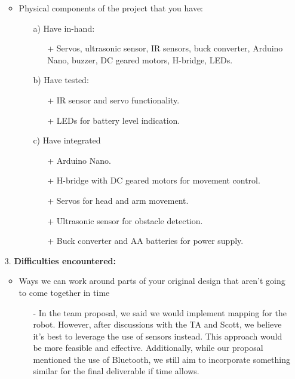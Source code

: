 \documentclass[12pt]{article}
\begin{document}
\begin{itemize}
\begin{itemize}
\begin{itemize}
        \end{itemize}
        \item Physical components of the project that you have:
        \begin{itemize}
            \item[a)] Have in-hand:
            \begin{itemize}
                \item[+] Servos, ultrasonic sensor, IR sensors, buck converter, Arduino Nano, buzzer, DC geared motors, H-bridge, LEDs.
            \end{itemize}
            \item[b)] Have tested:
            \begin{itemize}
                \item[+] IR sensor and servo functionality.
                \item[+] LEDs for battery level indication.
            \end{itemize}
            \item[c)] Have integrated
            \begin{itemize}
                \item[+] Arduino Nano.
                \item[+] H-bridge with DC geared motors for movement control.
                \item[+] Servos for head and arm movement.
                \item[+] Ultrasonic sensor for obstacle detection.
                \item[+] Buck converter and AA batteries for power supply.
            \end{itemize}
        \end{itemize}
    \end{itemize}
    \item[3.] \textbf{Difficulties encountered:}
    \begin{itemize}
        \item Ways we can work around parts of your original design that aren't going to come together in time
        \begin{itemize}
            \item[-] In the team proposal, we said we would implement mapping for the robot. However, after discussions with the TA and Scott, we believe it's best to leverage the use of sensors instead. This approach would be more feasible and effective. Additionally, while our proposal mentioned the use of Bluetooth, we still aim to incorporate something similar for the final deliverable if time allows.

\end{itemize}
\end{itemize}
\end{itemize}
\end{document}
